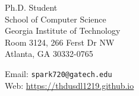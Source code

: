 \begin{minipage}[t]{0.45\textwidth}
  Ph.D. Student\\
  School of Computer Science\\
  Georgia Institute of Technology\\
  Room 3124, 266 Ferst Dr NW\\
  Atlanta, GA 30332-0765
\end{minipage}
\begin{minipage}[t]{0.45\textwidth}
  Email: \texttt{spark720@gatech.edu} \\
  Web: \url{https://thdusdl1219.github.io} \\
\end{minipage}
